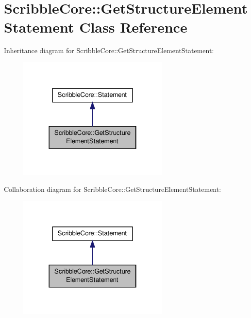 \hypertarget{class_scribble_core_1_1_get_structure_element_statement}{\section{Scribble\-Core\-:\-:Get\-Structure\-Element\-Statement Class Reference}
\label{class_scribble_core_1_1_get_structure_element_statement}
}


Inheritance diagram for Scribble\-Core\-:\-:Get\-Structure\-Element\-Statement\-:
\nopagebreak
\begin{figure}[H]
\begin{center}
\leavevmode
\includegraphics[width=214pt]{class_scribble_core_1_1_get_structure_element_statement__inherit__graph}
\end{center}
\end{figure}


Collaboration diagram for Scribble\-Core\-:\-:Get\-Structure\-Element\-Statement\-:
\nopagebreak
\begin{figure}[H]
\begin{center}
\leavevmode
\includegraphics[width=214pt]{class_scribble_core_1_1_get_structure_element_statement__coll__graph}
\end{center}
\end{figure}
